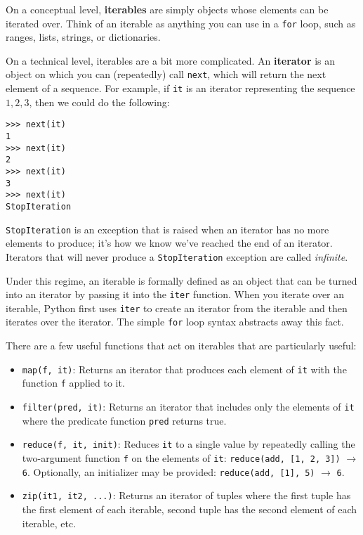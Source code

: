 \begin{blocksection}
On a conceptual level, \textbf{iterables} are simply objects whose elements can be iterated over. Think of an iterable as anything you can use in a \lstinline{for} loop, such as ranges, lists, strings, or dictionaries.

On a technical level, iterables are a bit more complicated. An \textbf{iterator} is an object on which you can (repeatedly) call \lstinline{next}, which will return the next element of a sequence. For example, if \lstinline{it} is an iterator representing the sequence $1, 2, 3$, then we could do the following: 
\begin{lstlisting}
>>> next(it)
1
>>> next(it)
2
>>> next(it)
3
>>> next(it)
StopIteration
\end{lstlisting}

\lstinline{StopIteration} is an exception that is raised when an iterator has no more elements to produce; it's how we know we've reached the end of an iterator. Iterators that will never produce a \lstinline{StopIteration} exception are called \textit{infinite}. 

Under this regime, an iterable is formally defined as an object that can be turned into an iterator by passing it into the \lstinline{iter} function. When you iterate over an iterable, Python first uses \lstinline{iter} to create an iterator from the iterable and then iterates over the iterator. The simple \lstinline{for} loop syntax abstracts away this fact. 

There are a few useful functions that act on iterables that are particularly useful: 
\begin{itemize}
    \item \lstinline{map(f, it)}: Returns an iterator that produces each element of \lstinline{it} with the function \lstinline{f} applied to it.
    \item \lstinline{filter(pred, it)}: Returns an iterator that includes only the elements of \lstinline{it} where the predicate function \lstinline{pred} returns true. 
    \item \lstinline{reduce(f, it, init)}: Reduces \lstinline{it} to a single value by repeatedly calling the two-argument function \lstinline{f} on the elements of \lstinline{it}: \lstinline{reduce(add, [1, 2, 3])} $\rightarrow$ \lstinline{6}. Optionally, an initializer may be provided: \lstinline{reduce(add, [1], 5)} $\rightarrow$ \lstinline{6}. 
    \item \lstinline{zip(it1, it2, ...)}: Returns an iterator of tuples where the first tuple has the first element of each iterable, second tuple has the second element of each iterable, etc. 
\end{itemize}
\end{blocksection}

